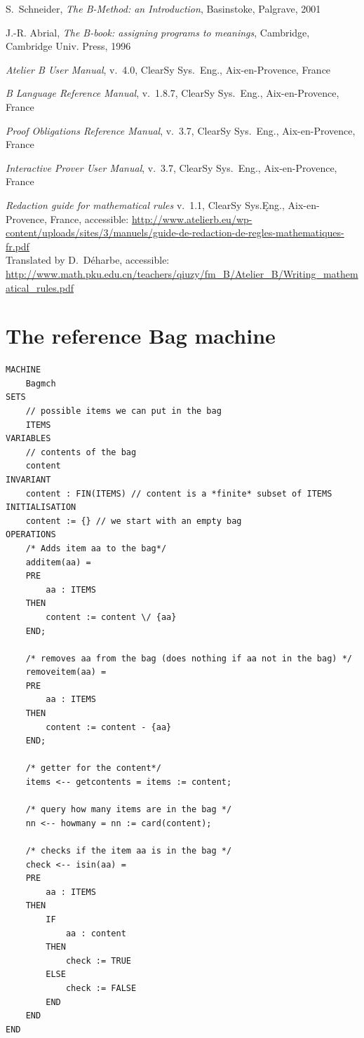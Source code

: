 \documentclass[11pt,journal]{IEEEtran}
\begin{document}
\begin{thebibliography}{2}
		S.~Schneider, \emph{The B-Method: an Introduction}, Basinstoke, Palgrave, 2001
		
		J.-R. Abrial, \emph{The B-book: assigning programs to meanings}, Cambridge, Cambridge Univ. Press, 1996
		
		\emph{Atelier B User Manual}, v.~4.0, ClearSy Sys.~Eng., Aix-en-Provence, France
		
		\emph{B Language Reference Manual}, v.~1.8.7, ClearSy Sys.~Eng., Aix-en-Provence, France
		
		\emph{Proof Obligations Reference Manual}, v.~3.7, ClearSy Sys.~Eng., Aix-en-Provence, France
		
		\emph{Interactive Prover User Manual}, v.~3.7, ClearSy Sys.~Eng., Aix-en-Provence, France
		
		\emph{Redaction guide for mathematical rules} v.~1.1, ClearSy Sys.Ęng., Aix-en-Provence, France, accessible: \url{http://www.atelierb.eu/wp-content/uploads/sites/3/manuels/guide-de-redaction-de-regles-mathematiques-fr.pdf}\\
		Translated by D.~D\'{e}harbe, accessible: 
		\url{http://www.math.pku.edu.cn/teachers/qiuzy/fm_B/Atelier_B/Writing_mathematical_rules.pdf}
		

		
		
		
		

		
	\end{thebibliography}
	

	\onecolumn
	\appendices
	\section{The reference Bag machine}
	\begin{lstlisting}
MACHINE
	Bagmch
SETS
	// possible items we can put in the bag
	ITEMS
VARIABLES
	// contents of the bag
	content
INVARIANT
	content : FIN(ITEMS) // content is a *finite* subset of ITEMS
INITIALISATION
	content := {} // we start with an empty bag
OPERATIONS
	/* Adds item aa to the bag*/
	additem(aa) =
	PRE
		aa : ITEMS
	THEN
		content := content \/ {aa}
	END;

	/* removes aa from the bag (does nothing if aa not in the bag) */
	removeitem(aa) =
	PRE
		aa : ITEMS
	THEN
		content := content - {aa}
	END;

	/* getter for the content*/
	items <-- getcontents = items := content;

	/* query how many items are in the bag */
	nn <-- howmany = nn := card(content);

	/* checks if the item aa is in the bag */
	check <-- isin(aa) = 
	PRE
		aa : ITEMS
	THEN
		IF 
			aa : content
		THEN
			check := TRUE
		ELSE
			check := FALSE
		END
	END
END
\end{lstlisting}
\pagebreak
\end{document}
